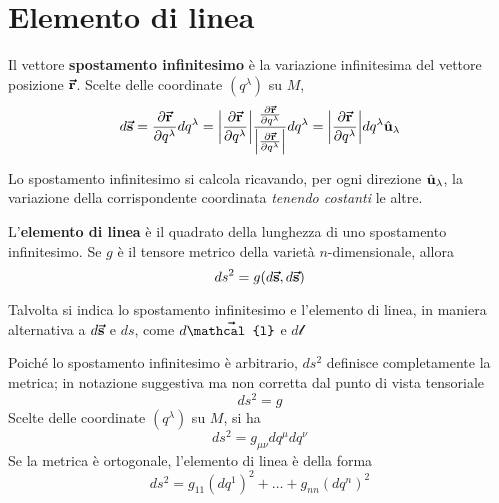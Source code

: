 \section{Elemento di linea}
\begin{define}
	Il vettore \textbf{spostamento infinitesimo} è la variazione infinitesima del vettore posizione $\vb*{\va{r}}$. Scelte delle coordinate $(q^\lambda)$ su $M$, %
	\begin{equation}
		d\vb*{\va{s}}=\pdv{\vb*{\va{r}}}{q^\lambda}dq^\lambda=\abs{\pdv{\vb*{\va{r}}}{q^\lambda}}\frac{\pdv{\vb*{\va{r}}}{q^\lambda}}{\abs{\pdv{\vb*{\va{r}}}{q^\lambda}}}dq^\lambda=\abs{\pdv{\vb*{\va{r}}}{q^\lambda}}dq^\lambda\hat{\mathbf{u}}_\lambda
	\end{equation}
\end{define}
Lo spostamento infinitesimo si calcola ricavando, per ogni direzione $\hat{\mathbf{u}}_\lambda$, la variazione della corrispondente coordinata \textit{tenendo costanti} le altre.
\begin{define}
	L'\textbf{elemento di linea} è il quadrato della lunghezza di uno spostamento infinitesimo. Se $g$ è il tensore metrico della varietà $n$-dimensionale, allora
	\begin{equation}
		ds^2=g(d\vb*{\va{s}},d\vb*{\va{s}})
	\end{equation}
\end{define}
\begin{notate}
	Talvolta si indica lo spostamento infinitesimo e l'elemento di linea, in maniera alternativa a $d\vb*{\va{s}}$ e $ds$, come $d\vba{\mathcal{l}}$ e $d\mathcal{l}$
\end{notate}
Poiché lo spostamento infinitesimo è arbitrario, $ds^2$ definisce completamente la metrica; in notazione suggestiva ma non corretta dal punto di vista tensoriale
\begin{equation}
	ds^2=g
\end{equation}
Scelte delle coordinate $(q^\lambda)$ su $M$, si ha
\begin{equation}
	ds^2=g_{\mu\nu}dq^{\mu}dq^{\nu}
\end{equation}
Se la metrica è ortogonale, l'elemento di linea è della forma
\begin{equation}
	ds^2=g_{11}\left(dq^1\right)^2+\ldots+g_{nn}\left(dq^n\right)^2
\end{equation}
